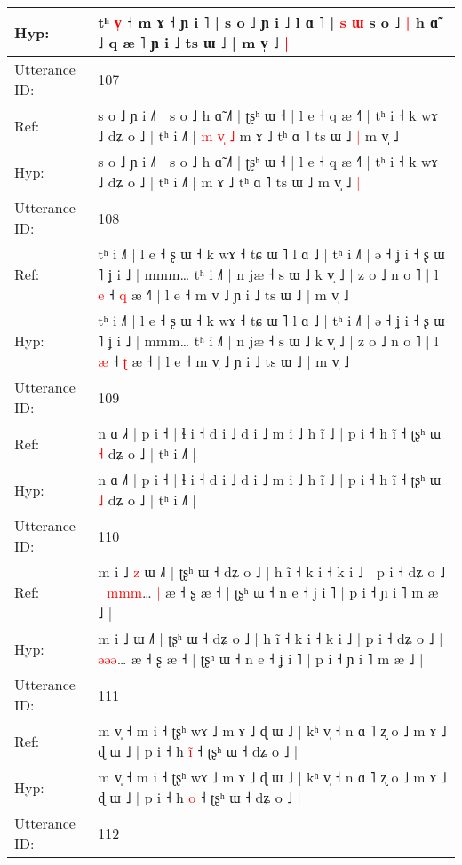 \documentclass[10pt]{article}
\DeclareRobustCommand{\hl}[1]{{\textcolor{red}{#1}}}
\begin{document}
\begin{longtable}{ll}
Hyp: & tʰ \hl{v}\hl{̩} ˧ m ɤ ˧ ɲ i ˥ | s o ˩ ɲ i ˩ l ɑ ˥ |\hl{ }\hl{s}\hl{ }\hl{ɯ} s o ˩\hl{ }\hl{|} h ɑ̃ ˩ q æ ˥ ɲ i ˩ ts ɯ ˩ | m v̩ ˩\hl{ }\hl{|}
 \\
\midrule
Utterance ID: & 107 \\
Ref: & s o ˩ ɲ i ˩˥ | s o ˩ h ɑ̃ ˩˥ | ʈʂʰ ɯ ˧ | l e ˧ q æ ˧˥ | tʰ i ˧ k wɤ ˩ dʑ o ˩ | tʰ i ˩˥ |\hl{ }\hl{m}\hl{ }\hl{v}\hl{̩}\hl{ }\hl{˩} m ɤ ˩ tʰ ɑ ˥ ts ɯ ˩\hl{ }\hl{|} m v̩ ˩\hl{}\hl{}
 \\
Hyp: & s o ˩ ɲ i ˩˥ | s o ˩ h ɑ̃ ˩˥ | ʈʂʰ ɯ ˧ | l e ˧ q æ ˧˥ | tʰ i ˧ k wɤ ˩ dʑ o ˩ | tʰ i ˩˥ |\hl{}\hl{}\hl{}\hl{}\hl{}\hl{}\hl{} m ɤ ˩ tʰ ɑ ˥ ts ɯ ˩\hl{}\hl{} m v̩ ˩\hl{ }\hl{|}
 \\
\midrule
Utterance ID: & 108 \\
Ref: & tʰ i ˩˥ | l e ˧ ʂ ɯ ˧ k wɤ ˧ tɕ ɯ ˥ l ɑ ˩ | tʰ i ˩˥ | ə ˧ ʝ i ˧ ʂ ɯ ˥ ʝ i ˩ | mmm… tʰ i ˩˥ | n jæ ˧ s ɯ ˩ k v̩ ˩ | z o ˩ n o ˥ | l \hl{e} ˧ \hl{q} æ ˧\hl{˥} | l e ˧ m v̩ ˩ ɲ i ˩ ts ɯ ˩ | m v̩ ˩
 \\
Hyp: & tʰ i ˩˥ | l e ˧ ʂ ɯ ˧ k wɤ ˧ tɕ ɯ ˥ l ɑ ˩ | tʰ i ˩˥ | ə ˧ ʝ i ˧ ʂ ɯ ˥ ʝ i ˩ | mmm… tʰ i ˩˥ | n jæ ˧ s ɯ ˩ k v̩ ˩ | z o ˩ n o ˥ | l \hl{æ} ˧ \hl{ʈ} æ ˧\hl{} | l e ˧ m v̩ ˩ ɲ i ˩ ts ɯ ˩ | m v̩ ˩
 \\
\midrule
Utterance ID: & 109 \\
Ref: & n ɑ ˩\hl{˧} | p i ˧ | ɬ i ˧ d i ˩ d i ˩ m i ˩ h ĩ ˩ | p i ˧ h ĩ ˧ ʈʂʰ ɯ \hl{˧} dʑ o ˩ | tʰ i ˩˥ |
 \\
Hyp: & n ɑ ˩\hl{˥} | p i ˧ | ɬ i ˧ d i ˩ d i ˩ m i ˩ h ĩ ˩ | p i ˧ h ĩ ˧ ʈʂʰ ɯ \hl{˩} dʑ o ˩ | tʰ i ˩˥ |
 \\
\midrule
Utterance ID: & 110 \\
Ref: & m i ˩\hl{ }\hl{z} ɯ ˩˥ | ʈʂʰ ɯ ˧ dʑ o ˩ | h ĩ ˧ k i ˧ k i ˩ | p i ˧ dʑ o ˩ | \hl{m}\hl{m}\hl{m}…\hl{ }\hl{|} æ ˧ ʂ æ ˧ | ʈʂʰ ɯ ˧ n e ˧ ʝ i ˥ | p i ˧ ɲ i ˥ m æ ˩ |
 \\
Hyp: & m i ˩\hl{}\hl{} ɯ ˩˥ | ʈʂʰ ɯ ˧ dʑ o ˩ | h ĩ ˧ k i ˧ k i ˩ | p i ˧ dʑ o ˩ | \hl{ə}\hl{ə}\hl{ə}…\hl{}\hl{} æ ˧ ʂ æ ˧ | ʈʂʰ ɯ ˧ n e ˧ ʝ i ˥ | p i ˧ ɲ i ˥ m æ ˩ |
 \\
\midrule
Utterance ID: & 111 \\
Ref: & m v̩ ˧ m i ˧ ʈʂʰ wɤ ˩ m ɤ ˩ ɖ ɯ ˩ | kʰ v̩ ˧ n ɑ ˥ ʐ o ˩ m ɤ ˩ ɖ ɯ ˩ | p i ˧ h \hl{i}\hl{̃} ˧ ʈʂʰ ɯ ˧ dʑ o ˩ |
 \\
Hyp: & m v̩ ˧ m i ˧ ʈʂʰ wɤ ˩ m ɤ ˩ ɖ ɯ ˩ | kʰ v̩ ˧ n ɑ ˥ ʐ o ˩ m ɤ ˩ ɖ ɯ ˩ | p i ˧ h \hl{}\hl{o} ˧ ʈʂʰ ɯ ˧ dʑ o ˩ |
 \\
\midrule
Utterance ID: & 112 \\

\end{longtable}
\end{document}
